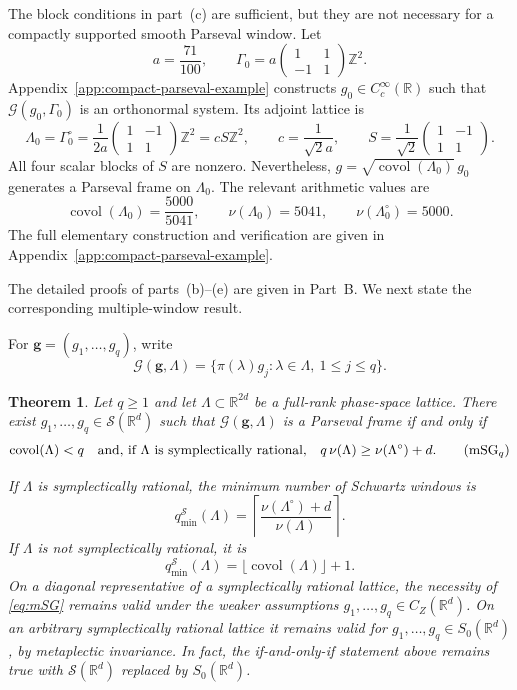 \documentclass[11pt,reqno]{amsart}
\numberwithin{equation}{section}
\newtheorem{theorem}{Theorem}[section]
\theoremstyle{definition}
\theoremstyle{remark}
\newcommand{\R}{\mathbb R}
\newcommand{\Z}{\mathbb Z}
\newcommand{\covol}{\operatorname{covol}}
\newcommand{\G}{\mathcal G}
\newcommand{\Sclass}{\mathcal S}
\newcommand{\CZ}{C_Z}
\newcommand{\Szero}{S_0}
\begin{document}
The block conditions in part~(c) are sufficient, but they are not necessary
for a compactly supported smooth Parseval window.  Let
\[
 a=\frac{71}{100},
 \qquad
 \Gamma_0=
 a\begin{pmatrix}1&1\\-1&1\end{pmatrix}\Z^2.
\]
Appendix~\ref{app:compact-parseval-example} constructs
$g_0\in C_c^\infty(\R)$ such that $\G(g_0,\Gamma_0)$ is an orthonormal
system.  Its adjoint lattice is
\[
 \Lambda_0=\Gamma_0^\circ
 =\frac1{2a}\begin{pmatrix}1&-1\\1&1\end{pmatrix}\Z^2
 =cS\Z^2,
 \qquad
 c=\frac1{\sqrt2a},
 \qquad
 S=\frac1{\sqrt2}\begin{pmatrix}1&-1\\1&1\end{pmatrix}.
\]
All four scalar blocks of $S$ are nonzero.  Nevertheless,
$g=\sqrt{\covol(\Lambda_0)}\,g_0$ generates a Parseval frame on
$\Lambda_0$.  The relevant arithmetic values are
\[
 \covol(\Lambda_0)=\frac{5000}{5041},
 \qquad
 \nu(\Lambda_0)=5041,
 \qquad
 \nu(\Lambda_0^\circ)=5000.
\]
The full elementary construction and verification are given in
Appendix~\ref{app:compact-parseval-example}.

The detailed proofs of parts~(b)--(e) are given in Part~B.  We next state the corresponding multiple-window result.

For $\mathbf g=(g_1,\ldots,g_q)$, write
\[
 \G(\mathbf g,\Lambda)
   =\{\pi(\lambda)g_j:\lambda\in\Lambda,\ 1\le j\le q\}.
\]

\begin{theorem}
\label{thm:main-multiwindow}
Let $q\ge1$ and let $\Lambda\subset\R^{2d}$ be a full-rank phase-space
lattice.  There exist $g_1,\ldots,g_q\in\Sclass(\R^d)$ such that
$\G(\mathbf g,\Lambda)$ is a Parseval frame if and only if
\begin{align}
 \covol(\Lambda)<q
 \quad\text{and, if $\Lambda$ is symplectically rational,}\quad
 q\,\nu(\Lambda)\ge\nu(\Lambda^\circ)+d.
 \tag{\ensuremath{\mathrm{mSG}_q}}\label{eq:mSG}
\end{align}

If $\Lambda$ is symplectically rational, the minimum number of Schwartz windows is
\[
 q_{\min}^{\Sclass}(\Lambda)
 =\left\lceil
    \frac{\nu(\Lambda^\circ)+d}{\nu(\Lambda)}
  \right\rceil.
\]
If $\Lambda$ is not symplectically rational, it is
\[
 q_{\min}^{\Sclass}(\Lambda)=\lfloor\covol(\Lambda)\rfloor+1.
\]
On a diagonal representative of a symplectically rational lattice, the necessity of \eqref{eq:mSG} remains
valid under the weaker assumptions $g_1,\ldots,g_q\in\CZ(\R^d)$.  On an
arbitrary symplectically rational lattice it remains valid for
$g_1,\ldots,g_q\in\Szero(\R^d)$, by metaplectic invariance.  In fact, the
if-and-only-if statement above remains true with $\Sclass(\R^d)$ replaced by
$\Szero(\R^d)$.
\end{theorem}
\end{document}
